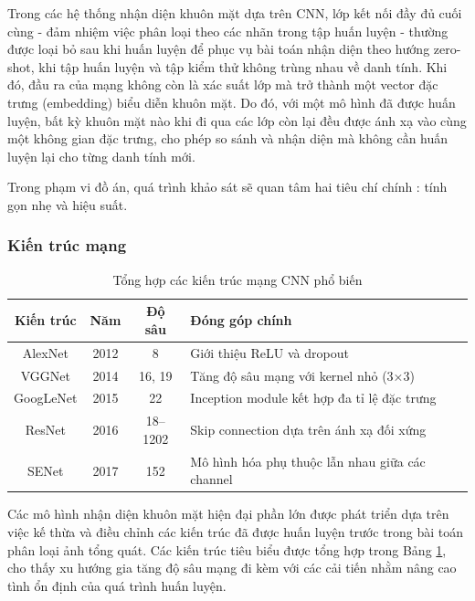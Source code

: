 Trong các hệ thống nhận diện khuôn mặt dựa trên CNN, lớp kết nối đầy đủ cuối cùng - đảm nhiệm việc phân loại theo các nhãn trong tập huấn luyện - thường được loại bỏ sau khi huấn luyện để phục vụ bài toán nhận diện theo hướng zero-shot, khi tập huấn luyện và tập kiểm thử không trùng nhau về danh tính. Khi đó, đầu ra của mạng không còn là xác suất lớp mà trở thành một vector đặc trưng (embedding) biểu diễn khuôn mặt. Do đó, với một mô hình đã được huấn luyện, bất kỳ khuôn mặt nào khi đi qua các lớp còn lại đều được ánh xạ vào cùng một không gian đặc trưng, cho phép so sánh và nhận diện mà không cần huấn luyện lại cho từng danh tính mới\cite{21_otoole_2021_face}.

Trong phạm vi đồ án, quá trình khảo sát sẽ quan tâm hai tiêu chí chính : tính gọn nhẹ và hiệu suất.

\subsubsection{Kiến trúc mạng}
\begin{table}[]
    \centering
    \small
    \begin{tabular}{|c|c|c|l|}
        \hline
        \textbf{Kiến trúc} & \textbf{Năm} &\textbf{ Độ sâu} & \textbf{Đóng góp chính} \\
        \hline
        AlexNet\cite{ARC_NIPS2012_c399862d} & 2012 & 8 & Giới thiệu ReLU và dropout\\
        VGGNet\cite{ARC_simonyan_2015_very} & 2014 & 16, 19 & Tăng độ sâu mạng với kernel nhỏ (3×3) \\
        GoogLeNet\cite{ARC_Szegedy_2015_CVPR} & 2015 & 22 & Inception module kết hợp đa tỉ lệ đặc trưng \\
        ResNet\cite{ARC_He_2016_CVPR} & 2016 & 18–1202 & Skip connection dựa trên ánh xạ đối xứng\\
        SENet\cite{ARC_Hu_2018_CVPR}& 2017 & 152 & Mô hình hóa phụ thuộc lẫn nhau giữa các channel \\
        \hline
    \end{tabular}
    \caption{Tổng hợp các kiến trúc mạng CNN phổ biến}
    \label{tab:CNN}
\end{table}

Các mô hình nhận diện khuôn mặt hiện đại phần lớn được phát triển dựa trên việc kế thừa và điều chỉnh các kiến trúc đã được huấn luyện trước trong bài toán phân loại ảnh tổng quát. Các kiến trúc tiêu biểu được tổng hợp trong Bảng \ref{tab:CNN}, cho thấy xu hướng gia tăng độ sâu mạng đi kèm với các cải tiến nhằm nâng cao tình ổn định của quá trình huấn luyện\cite{20_WANG2021215}. 

